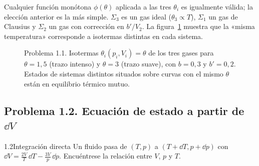 \begin{observacion}[Unicidad]
Cualquier función monótona $\phi(\theta)$ aplicada a las tres $\theta_i$ es igualmente válida; la elección
anterior es la más simple. $\Sigma_3$ es un gas ideal ($\theta_3\propto T$), $\Sigma_1$ un gas de Clausius y
$\Sigma_2$ un gas con corrección en $b'/V_2$. La figura~\ref{fig:p11} muestra que la «misma temperatura»
corresponde a isotermas distintas en cada sistema.
\end{observacion}

\begin{figure}[htbp]
\centering
{}
\caption{Problema 1.1. Isotermas $\theta_i(p_i,V_i)=\theta$ de los tres gases para $\theta=1{,}5$ (trazo
intenso) y $\theta=3$ (trazo suave), con $b=0{,}3$ y $b'=0{,}2$. Estados de sistemas distintos situados
sobre curvas con el mismo $\theta$ están en equilibrio térmico mutuo.}
\label{fig:p11}
\end{figure}

\subsection{Problema 1.2. Ecuación de estado a partir de \texorpdfstring{$\dd V$}{dV}}
\begin{problema}{1.2}{Integración directa}
Un fluido pasa de $(T,p)$ a $(T+\dd T,p+\dd p)$ con $\displaystyle\dd V=\frac{2V}{T}\,\dd T-\frac{3V}{p}\,\dd p$.
Encuéntrese la relación entre $V$, $p$ y $T$.
\end{problema}

